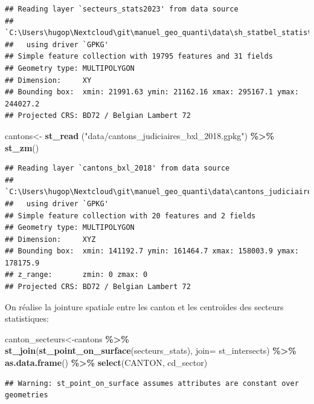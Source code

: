 \documentclass[
]{book}
\newenvironment{Shaded}{\begin{snugshade}}{\end{snugshade}}
\newcommand{\AttributeTok}[1]{\textcolor[rgb]{0.13,0.29,0.53}{#1}}
\newcommand{\FunctionTok}[1]{\textcolor[rgb]{0.13,0.29,0.53}{\textbf{#1}}}
\newcommand{\NormalTok}[1]{#1}
\newcommand{\OtherTok}[1]{\textcolor[rgb]{0.56,0.35,0.01}{#1}}
\newcommand{\SpecialCharTok}[1]{\textcolor[rgb]{0.81,0.36,0.00}{\textbf{#1}}}
\newcommand{\StringTok}[1]{\textcolor[rgb]{0.31,0.60,0.02}{#1}}
\begin{document}
\begin{verbatim}
## Reading layer `secteurs_stats2023' from data source 
##   `C:\Users\hugop\Nextcloud\git\manuel_geo_quanti\data\sh_statbel_statistical_sectors_31370_20230101.gpkg' 
##   using driver `GPKG'
## Simple feature collection with 19795 features and 31 fields
## Geometry type: MULTIPOLYGON
## Dimension:     XY
## Bounding box:  xmin: 21991.63 ymin: 21162.16 xmax: 295167.1 ymax: 244027.2
## Projected CRS: BD72 / Belgian Lambert 72
\end{verbatim}

\begin{Shaded}
\begin{Highlighting}[]
\NormalTok{cantons}\OtherTok{\textless{}{-}} \FunctionTok{st\_read}\NormalTok{ (}\StringTok{"data/cantons\_judiciaires\_bxl\_2018.gpkg"}\NormalTok{) }\SpecialCharTok{\%\textgreater{}\%}
  \FunctionTok{st\_zm}\NormalTok{()}
\end{Highlighting}
\end{Shaded}

\begin{verbatim}
## Reading layer `cantons_bxl_2018' from data source 
##   `C:\Users\hugop\Nextcloud\git\manuel_geo_quanti\data\cantons_judiciaires_bxl_2018.gpkg' 
##   using driver `GPKG'
## Simple feature collection with 20 features and 2 fields
## Geometry type: MULTIPOLYGON
## Dimension:     XYZ
## Bounding box:  xmin: 141192.7 ymin: 161464.7 xmax: 158003.9 ymax: 178175.9
## z_range:       zmin: 0 zmax: 0
## Projected CRS: BD72 / Belgian Lambert 72
\end{verbatim}

On réalise la jointure spatiale entre les canton et les centroïdes des
secteurs statistiques:

\begin{Shaded}
\begin{Highlighting}[]
\NormalTok{canton\_secteurs}\OtherTok{\textless{}{-}}\NormalTok{cantons }\SpecialCharTok{\%\textgreater{}\%}
  \FunctionTok{st\_join}\NormalTok{(}\FunctionTok{st\_point\_on\_surface}\NormalTok{(secteurs\_stats), }\AttributeTok{join=}\NormalTok{ st\_intersects) }\SpecialCharTok{\%\textgreater{}\%}
  \FunctionTok{as.data.frame}\NormalTok{() }\SpecialCharTok{\%\textgreater{}\%}
  \FunctionTok{select}\NormalTok{(CANTON, cd\_sector)}
\end{Highlighting}
\end{Shaded}

\begin{verbatim}
## Warning: st_point_on_surface assumes attributes are constant over geometries
\end{verbatim}
\end{document}
